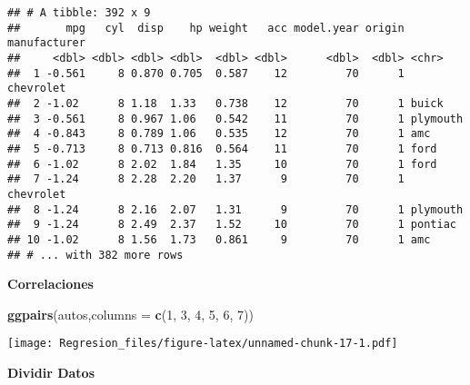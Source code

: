 \documentclass[]{article}
\newenvironment{Shaded}{\begin{snugshade}}{\end{snugshade}}
\newcommand{\DataTypeTok}[1]{\textcolor[rgb]{0.13,0.29,0.53}{#1}}
\newcommand{\DecValTok}[1]{\textcolor[rgb]{0.00,0.00,0.81}{#1}}
\newcommand{\FloatTok}[1]{\textcolor[rgb]{0.00,0.00,0.81}{#1}}
\newcommand{\KeywordTok}[1]{\textcolor[rgb]{0.13,0.29,0.53}{\textbf{#1}}}
\newcommand{\NormalTok}[1]{#1}
\newcommand{\OperatorTok}[1]{\textcolor[rgb]{0.81,0.36,0.00}{\textbf{#1}}}
\newcommand{\OtherTok}[1]{\textcolor[rgb]{0.56,0.35,0.01}{#1}}
\newcommand{\StringTok}[1]{\textcolor[rgb]{0.31,0.60,0.02}{#1}}
\begin{document}
\begin{verbatim}
## # A tibble: 392 x 9
##       mpg   cyl  disp    hp weight   acc model.year origin manufacturer
##     <dbl> <dbl> <dbl> <dbl>  <dbl> <dbl>      <dbl>  <dbl> <chr>       
##  1 -0.561     8 0.870 0.705  0.587    12         70      1 chevrolet   
##  2 -1.02      8 1.18  1.33   0.738    12         70      1 buick       
##  3 -0.561     8 0.967 1.06   0.542    11         70      1 plymouth    
##  4 -0.843     8 0.789 1.06   0.535    12         70      1 amc         
##  5 -0.713     8 0.713 0.816  0.564    11         70      1 ford        
##  6 -1.02      8 2.02  1.84   1.35     10         70      1 ford        
##  7 -1.24      8 2.28  2.20   1.37      9         70      1 chevrolet   
##  8 -1.24      8 2.16  2.07   1.31      9         70      1 plymouth    
##  9 -1.24      8 2.49  2.37   1.52     10         70      1 pontiac     
## 10 -1.02      8 1.56  1.73   0.861     9         70      1 amc         
## # ... with 382 more rows
\end{verbatim}

\textbf{Correlaciones}

\begin{Shaded}
\begin{Highlighting}[]
\KeywordTok{ggpairs}\NormalTok{(autos,}\DataTypeTok{columns =} \KeywordTok{c}\NormalTok{(}\DecValTok{1}\NormalTok{, }\DecValTok{3}\NormalTok{, }\DecValTok{4}\NormalTok{, }\DecValTok{5}\NormalTok{, }\DecValTok{6}\NormalTok{, }\DecValTok{7}\NormalTok{))}
\end{Highlighting}
\end{Shaded}

\texttt{[image: Regresion\_files/figure-latex/unnamed-chunk-17-1.pdf]}

\textbf{Dividir Datos}

\begin{Shaded}
\end{Shaded}
\end{document}
